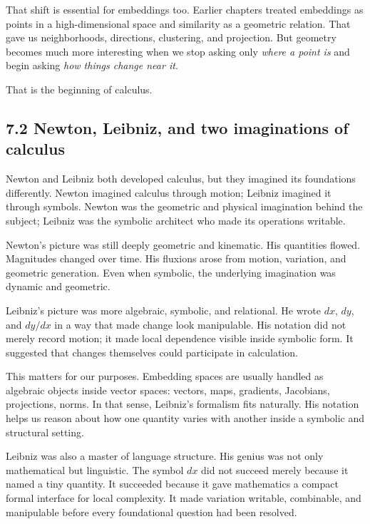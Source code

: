 That shift is essential for embeddings too. Earlier chapters treated
embeddings as points in a high-dimensional space and similarity as a
geometric relation. That gave us neighborhoods, directions, clustering,
and projection. But geometry becomes much more interesting when we stop
asking only \emph{where a point is} and begin asking \emph{how things
change near it}.

That is the beginning of calculus.

\hypertarget{newton-leibniz-and-two-imaginations-of-calculus}{%
\subsection{7.2 Newton, Leibniz, and two imaginations of
calculus}\label{newton-leibniz-and-two-imaginations-of-calculus}}

Newton and Leibniz both developed calculus, but they imagined its
foundations differently. Newton imagined calculus through motion;
Leibniz imagined it through symbols. Newton was the geometric and
physical imagination behind the subject; Leibniz was the symbolic
architect who made its operations writable.

Newton's picture was still deeply geometric and kinematic. His
quantities flowed. Magnitudes changed over time. His fluxions arose from
motion, variation, and geometric generation. Even when symbolic, the
underlying imagination was dynamic and geometric.

Leibniz's picture was more algebraic, symbolic, and relational. He wrote
\(dx\), \(dy\), and \(dy/dx\) in a way that made change look
manipulable. His notation did not merely record motion; it made local
dependence visible inside symbolic form. It suggested that changes
themselves could participate in calculation.

This matters for our purposes. Embedding spaces are usually handled as
algebraic objects inside vector spaces: vectors, maps, gradients,
Jacobians, projections, norms. In that sense, Leibniz's formalism fits
naturally. His notation helps us reason about how one quantity varies
with another inside a symbolic and structural setting.

Leibniz was also a master of language structure. His genius was not only
mathematical but linguistic. The symbol \(dx\) did not succeed merely
because it named a tiny quantity. It succeeded because it gave
mathematics a compact formal interface for local complexity. It made
variation writable, combinable, and manipulable before every
foundational question had been resolved.


